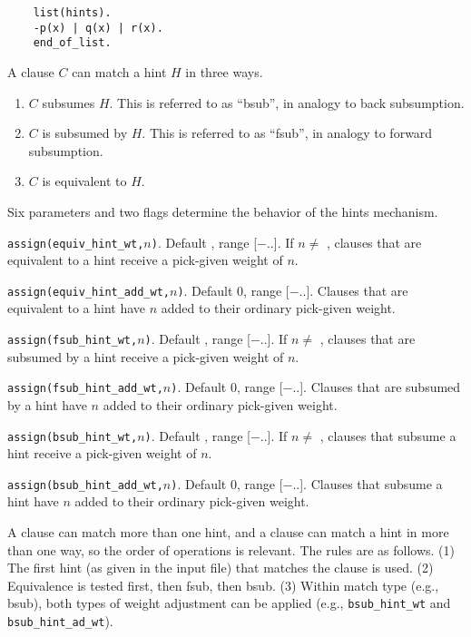 \documentclass[11pt]{article}
\begin{document}
{\small
\begin{verbatim}
    list(hints).
    -p(x) | q(x) | r(x).
    end_of_list.
\end{verbatim}
}
\noindent
A clause $C$ can match a hint $H$ in three ways.
\begin{enumerate}
\item $C$ subsumes $H$.
This is referred to as ``bsub'', in analogy to back subsumption.
\item $C$ is subsumed by $H$.
This is referred to as ``fsub'', in analogy to forward subsumption.
\item $C$ is equivalent to $H$.
\end{enumerate}
Six parameters and two flags determine the behavior of the hints mechanism.

\noindent
\verb:assign(equiv_hint_wt,:$n$\verb:):.  Default \maxint, range [$-$\maxint ..\maxint ].
If $n \neq$ \maxint,
clauses that are equivalent to a hint receive a pick-given weight of $n$.

\noindent
\verb:assign(equiv_hint_add_wt,:$n$\verb:):.  Default 0, range [$-$\maxint ..\maxint ].
Clauses that are equivalent to a hint have $n$ added to their ordinary
pick-given weight.

\noindent
\verb:assign(fsub_hint_wt,:$n$\verb:):.  Default \maxint, range [$-$\maxint ..\maxint ].
If $n \neq$ \maxint,
clauses that are subsumed by a hint receive a pick-given weight of $n$.

\noindent
\verb:assign(fsub_hint_add_wt,:$n$\verb:):.  Default 0, range [$-$\maxint ..\maxint ].
Clauses that are subsumed by a hint have $n$ added to their ordinary
pick-given weight.

\noindent
\verb:assign(bsub_hint_wt,:$n$\verb:):.  Default \maxint, range [$-$\maxint ..\maxint ].
If $n \neq$ \maxint,
clauses that subsume a hint receive a pick-given weight of $n$.

\noindent
\verb:assign(bsub_hint_add_wt,:$n$\verb:):.  Default 0, range [$-$\maxint ..\maxint ].
Clauses that subsume a hint have $n$ added to their ordinary
pick-given weight.

A clause can match more than one hint, and a clause can match a hint
in more than one way, so the order of operations is relevant.
The rules are as follows.  (1) The first hint (as given in the input
file) that matches the clause is used.  (2) Equivalence is tested
first, then fsub, then bsub.  (3) Within match type (e.g., bsub), both
types of weight adjustment can be applied (e.g.,
\verb:bsub_hint_wt: and \verb:bsub_hint_ad_wt:).
\end{document}
